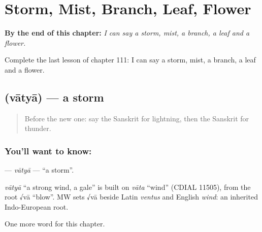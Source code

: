 
\chapter{Storm, Mist, Branch, Leaf, Flower}
\label{ch:sa-storm-mist-branch-leaf-flower}

\begin{chapteropening}
\textbf{By the end of this chapter:} \emph{I can say a storm, mist, a branch, a leaf and a flower.}

Complete the last lesson of chapter 111: I can say a storm, mist, a branch, a leaf and a flower.
\end{chapteropening}

\section[\texorpdfstring{\sk{वात्या} (vātyā)}{वात्या (vātyā)}]{ (vātyā) — a storm}

\label{lesson:SA-C111-vatya}



\begin{quote}
Before the new one: say the Sanskrit for lightning, then the Sanskrit for thunder.
\end{quote}

\subsection*{You'll want to know: }
\textbf{} — \emph{vātyā} — \textquotedblleft{}a storm\textquotedblright{}.

\begin{cousinweb}
\emph{vātyā} \textquotedblleft{}a strong wind, a gale\textquotedblright{} is built on \emph{vāta} \textquotedblleft{}wind\textquotedblright{} (CDIAL 11505), from the root √vā \textquotedblleft{}blow\textquotedblright{}. MW sets √vā beside Latin \emph{ventus} and English \emph{wind}: an inherited Indo-European root.
\end{cousinweb}

\begin{grammarlens}[title={What you've built}]
One more word for this chapter.
\end{grammarlens}

